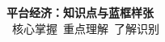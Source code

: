 \documentclass[12pt,a4paper,fontset=none]{ctexart}
\begin{document}
\begin{center}
{\LARGE\bfseries 平台经济：知识点与蓝框样张}\\[0.4ex]
{\small \PriorityMust\ 核心掌握\quad\PriorityImportant\ 重点理解\quad\PriorityKnow\ 了解识别}
\end{center}
\StudyDivider


\end{document}
